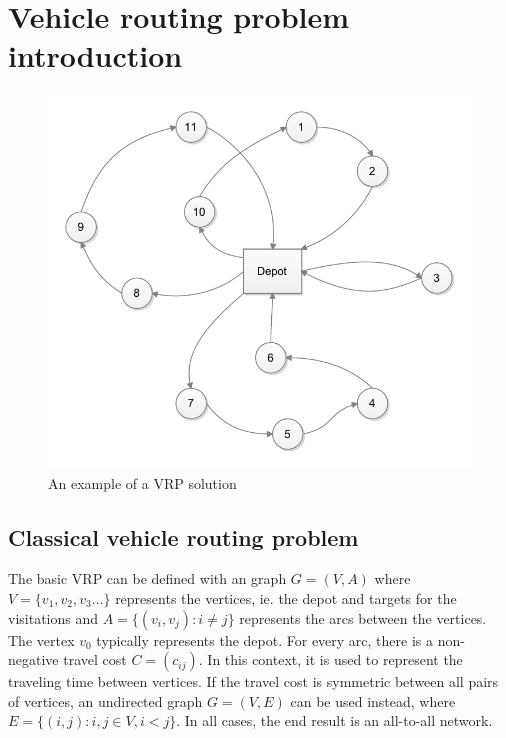 \chapter{Vehicle routing problem introduction}
\label{chapter:background} 

\begin{figure}[h]
  \begin{center}
    \includegraphics{images/vrpbasic.pdf}
    \caption{An example of a VRP solution}
    \label{fig:simplenetwork}
  \end{center}
\end{figure}

\section{Classical vehicle routing problem}



The basic VRP can be defined with an graph $G = (V, A)$ where $V = \{v_1, v_2, v_3\dots\}$ represents the vertices, ie. the depot and targets for the visitations and $A = \{(v_i, v_j): i \neq j \}$ represents the arcs between the vertices. The vertex $v_0$ typically represents the depot. For every arc, there is a non-negative travel cost $C=(c_{ij})$. In this context, it is used to represent the traveling time between vertices. If the travel cost is symmetric between all pairs of vertices, an undirected graph $G = (V, E)$ can be used instead, where $E=\{(i, j) : i, j \in V, i < j\}$. In all cases, the end result is an all-to-all network. \cite{laporte2007you} 

